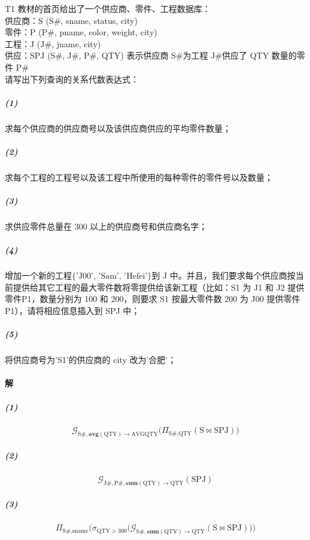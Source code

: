 \documentclass{article}
\makeatletter
\renewcommand{\section}{\@startsection{section}{1}{0mm}
                                {-5ex plus -.5ex minus -.2ex}
                                {3ex plus .2ex}
                                {\normalfont\large\bfseries}}
\makeatother
\begin{document}
\section{T1 教材的首页给出了一个供应商、零件、工程数据库：
  \protect\\ \indent 供应商：S (S\#, sname, status, city)
  \protect\\ \indent 零件：P (P\#, pname, color, weight, city)
  \protect\\ \indent 工程：J (J\#, jname, city)
  \protect\\ \indent 供应：SPJ (S\#, J\#, P\#, QTY) 表示供应商 S\#为工程 J\#供应了 QTY 数量的零件 P\#
  \protect\\ 请写出下列查询的关系代数表达式：}
\subparagraph{(1)} 求每个供应商的供应商号以及该供应商供应的平均零件数量；
\subparagraph{(2)} 求每个工程的工程号以及该工程中所使用的每种零件的零件号以及数量；
\subparagraph{(3)} 求供应零件总量在 300 以上的供应商号和供应商名字；
\subparagraph{(4)} 增加一个新的工程$\{\text{'J00'},\, \text{'Sam'},\, \text{'Hefei'}\}$到 J 中。并且，我们要求每个供应商按当前提供给其它工程的最大零件数将零提供给该新工程（比如：S1 为 J1 和 J2 提供零件P1，数量分别为 100 和 200，则要求 S1 按最大零件数 200 为 J00 提供零件 P1），请将相应信息插入到 SPJ 中；
\subparagraph{(5)} 将供应商号为'S1'的供应商的 city 改为'合肥'；

\paragraph{解}
\subparagraph{(1)}
\begin{Large}
    \begin{equation*}
        \mathcal{G}_{\text{S\#}, \textbf{avg}(\text{QTY}) \rightarrow \text{AVGQTY}}\big(\Pi_{\text{S\#}, \text{QTY}}(\text{S} \Join \text{SPJ})\big)
    \end{equation*}
\end{Large}

\subparagraph{(2)}
\begin{Large}
    \begin{equation*}
        \mathcal{G}_{\text{J\#}, \text{P\#}, \textbf{sum}(\text{QTY}) \rightarrow \text{QTY}}(\text{SPJ})
    \end{equation*}
\end{Large}

\subparagraph{(3)}
\begin{Large}
    \begin{equation*}
        \Pi_{\text{S\#}, \text{sname}}\Big(\sigma_{\text{QTY} > 300}\big(\mathcal{G}_{\text{S\#}, \textbf{sum}(\text{QTY}) \rightarrow \text{QTY}}(\text{S} \Join \text{SPJ})\big)\Big)
    \end{equation*}
\end{Large}
\end{document}
